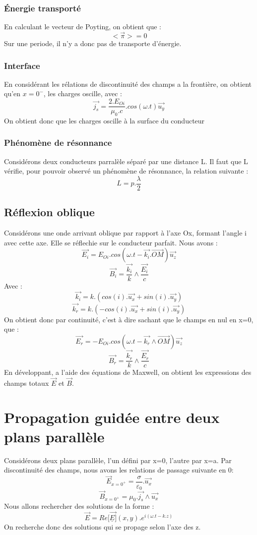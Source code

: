 \subsubsection{Énergie transporté}
En calculant le vecteur de Poyting, on obtient que : 
$$<\overrightarrow{\pi}> = 0$$
Sur une periode, il n'y a donc pas de transporte d'énergie.
\subsubsection{Interface}
En considérant les rélations de discontinuité des champs a la frontière, on obtient qu'en $x = 0^-$, les charges oscille, avec : 
$$\overrightarrow{j_s} = \dfrac{2.E_{Oi}}{\mu_0.c}.cos(\omega.t)\overrightarrow{u_y}$$
On obtient donc que les charges oscille à la surface du conducteur
\subsubsection{Phénomène de résonnance}
Considérons deux conducteurs parralèle séparé par une distance L. Il faut que L vérifie, pour pouvoir observé un phénomène de résonnance, la relation suivante : 
$$L = p.\dfrac{\lambda}{2}$$
\subsection{Réflexion oblique}
Considérons une onde arrivant oblique par rapport à l'axe Ox, formant l'angle i avec cette axe. Elle se réflechie sur le conducteur parfait. Nous avons : 
$$\overrightarrow{E_i} = E_{Oi}.cos(\omega.t-\overrightarrow{k_i}.\overrightarrow{OM})\overrightarrow{u_z}$$
$$\overrightarrow{B_i} = \dfrac{\overrightarrow{k_i}}{k}\wedge\dfrac{\overrightarrow{E_i}}{c}$$
Avec : 
$$\overrightarrow{k_i} = k.(cos(i).\overrightarrow{u_x}+sin(i).\overrightarrow{u_y})$$
$$\overrightarrow{k_r} = k.(-cos(i).\overrightarrow{u_x}+sin(i).\overrightarrow{u_y})$$
On obtient donc par continuité, c'est à dire sachant que le champs en nul en x=0, que : 
$$\overrightarrow{E_r} = -E_{Oi}.cos(\omega.t - \overrightarrow{k_r}\wedge\overrightarrow{OM})\overrightarrow{u_z}$$
$$\overrightarrow{B_r} = \dfrac{\overrightarrow{k_r}}{k}\wedge\dfrac{\overrightarrow{E_r}}{c}$$
En développant, a l'aide des équations de Maxwell, on obtient les expressions des champs totaux $\overrightarrow{E}$ et $\overrightarrow{B}$.
\section{Propagation guidée entre deux plans parallèle}
Considérons deux plans parallèle, l'un défini par x=0, l'autre par x=a. Par discontinuité des champs, nous avons les relations de passage suivante en 0:
$$\overrightarrow{E}_{x = 0^+} = \dfrac{\sigma}{\varepsilon_0}.\overrightarrow{u_x}$$
$$\overrightarrow{B}_{x = 0^+} = \mu_0.\overrightarrow{j_s}\wedge\overrightarrow{u_x}$$
Nous allons rechercher des solutions de la forme : 
$$\overrightarrow{E} = Re[\overrightarrow{\underline{E}]}(x,y).e^{i(\omega.t - k.z)}$$
On recherche donc des solutions qui se propage selon l'axe des z.

